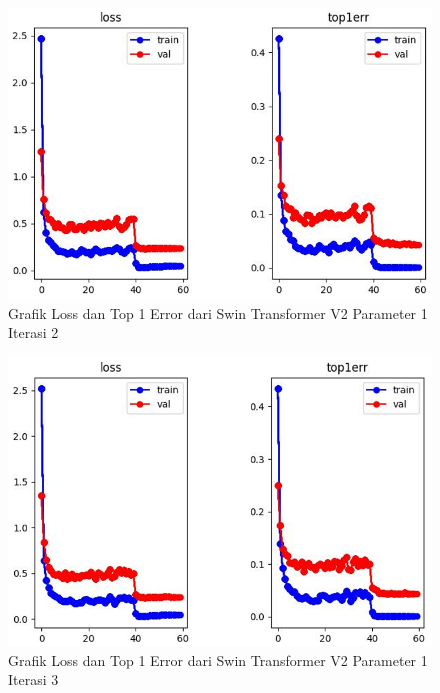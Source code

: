 \begin{figure}[ht]
  \centering
  \includegraphics[scale=0.6]{gambar/Train SwinV2_1.png}
  \caption{Grafik Loss dan Top 1 Error dari Swin Transformer V2 Parameter 1 Iterasi 2}
  \label{fig:grafiklossdantop1errdariprosestrainingdanvalidationswinv2iterasi2}
\end{figure}

\begin{figure}[ht]
  \centering
  \includegraphics[scale=0.6]{gambar/Train SwinV2_2.png}
  \caption{Grafik Loss dan Top 1 Error dari Swin Transformer V2 Parameter 1 Iterasi 3}
  \label{fig:grafiklossdantop1errdariprosestrainingdanvalidationswinv2iterasi3}
\end{figure}


